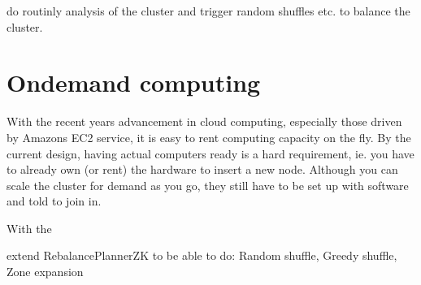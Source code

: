 do routinly analysis of the cluster and trigger random shuffles etc. to balance the cluster.

\section{Ondemand computing}
With the recent years advancement in cloud computing, especially those driven by Amazons EC2 service, it is easy to rent computing capacity on the fly. By the current design, having actual computers ready is a hard requirement, ie. you have to already own (or rent) the hardware to insert a new node. Although you can scale the cluster for demand as you go, they still have to be set up with software and told to join in.

With the 

extend RebalancePlannerZK to be able to do: Random shuffle, Greedy shuffle, Zone expansion
